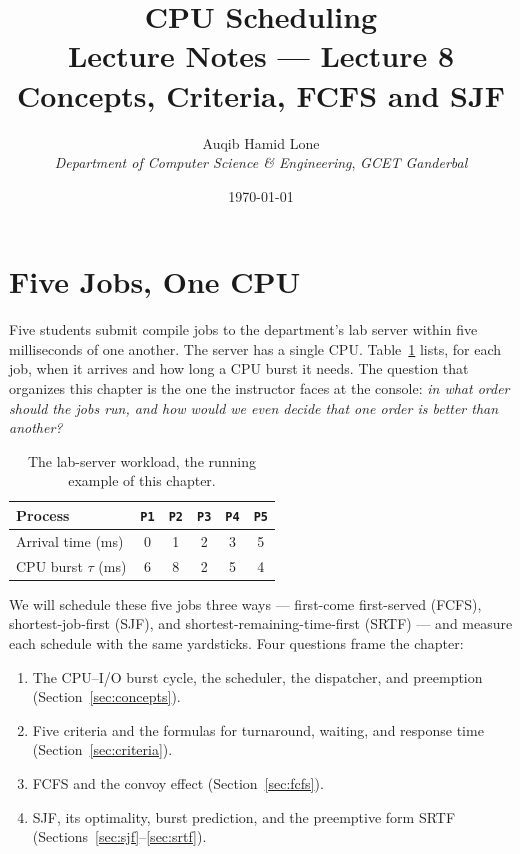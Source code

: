 \documentclass[11pt]{article}
\title{CPU Scheduling\\\large Lecture Notes --- Lecture 8\\
  \normalsize Concepts, Criteria, FCFS and SJF}
\author{Auqib Hamid Lone\\[0.3em]
  \emph{Department of Computer Science \& Engineering}, \emph{GCET Ganderbal}}
\date{\today}
\begin{document}
\maketitle

\section{Five Jobs, One CPU}

Five students submit compile jobs to the department's lab server within five
milliseconds of one another. The server has a single CPU. Table~\ref{tab:lab}
lists, for each job, when it arrives and how long a CPU burst it needs. The
question that organizes this chapter is the one the instructor faces at the
console: \emph{in what order should the jobs run, and how would we even decide
that one order is better than another?}

\begin{table}[h]
\centering
\begin{tabular}{lccccc}
  \toprule
  Process & \texttt{P1} & \texttt{P2} & \texttt{P3} & \texttt{P4} & \texttt{P5} \\
  \midrule
  Arrival time (ms) & 0 & 1 & 2 & 3 & 5 \\
  CPU burst $\tau$ (ms) & 6 & 8 & 2 & 5 & 4 \\
  \bottomrule
\end{tabular}
\caption{The lab-server workload, the running example of this chapter.}
\label{tab:lab}
\end{table}

We will schedule these five jobs three ways --- first-come first-served (FCFS),
shortest-job-first (SJF), and shortest-remaining-time-first (SRTF) --- and
measure each schedule with the same yardsticks. Four questions frame the
chapter:

\begin{enumerate}
  \item {} The CPU--I/O burst cycle, the scheduler, the
        dispatcher, and preemption (Section~\ref{sec:concepts}).
  \item {} Five criteria and the formulas for
        turnaround, waiting, and response time (Section~\ref{sec:criteria}).
  \item {} FCFS and the convoy effect
        (Section~\ref{sec:fcfs}).
  \item {} SJF, its optimality, burst prediction, and the
        preemptive form SRTF (Sections~\ref{sec:sjf}--\ref{sec:srtf}).
\end{enumerate}
\end{document}
